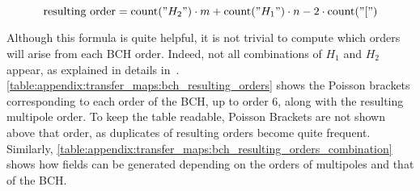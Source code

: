 \begin{equation}
  \text{resulting order} = \text{count}("H_2") \cdot m + \text{count}("H_1") \cdot{n} - 2 \cdot \text{count}("[")
  \label{eq:appendix:bch_formula_resulting_order}
\end{equation}

Although this formula is quite helpful, it is not trivial to compute which orders will arise from
each BCH order. Indeed, not all combinations of $H_1$ and $H_2$ appear, as explained in details 
in~\cite{casas_efficient_2009}. \cref{table:appendix:transfer_maps:bch_resulting_orders} shows the
Poisson brackets corresponding to each order of the BCH, up to order 6, along with the resulting
multipole order. To keep the table readable, Poisson Brackets are not shown above that order, as
duplicates of resulting orders become quite frequent.
Similarly, \cref{table:appendix:transfer_maps:bch_resulting_orders_combination} shows how fields
can be generated depending on the orders of multipoles and that of the BCH.

